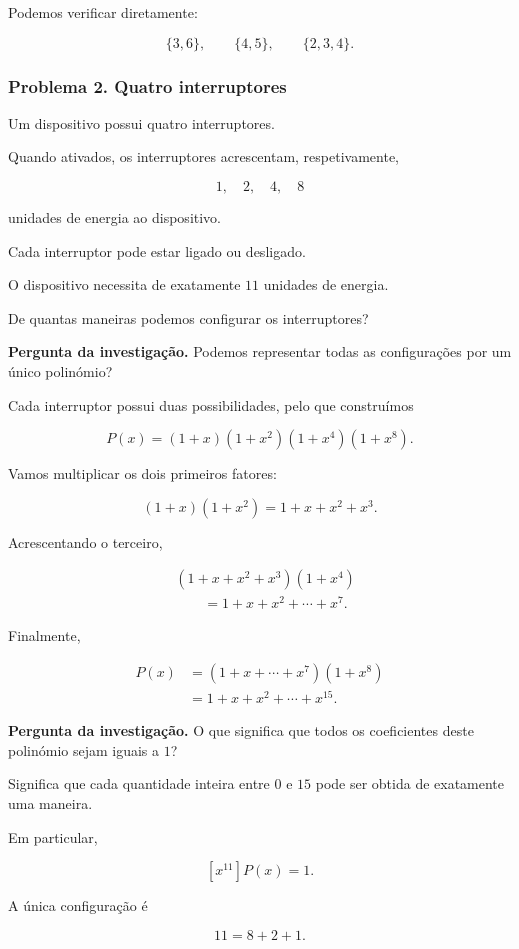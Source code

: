 \documentclass[11pt,a4paper,oneside]{book}
\newcommand{\Pergunta}[1]{\begin{perguntabox}\textbf{Pergunta da investigação.} #1\end{perguntabox}}
\begin{document}
Podemos verificar diretamente:

\[
\{3,6\},\qquad
\{4,5\},\qquad
\{2,3,4\}.
\]

\subsubsection*{Problema 2. Quatro interruptores}

Um dispositivo possui quatro interruptores.

Quando ativados, os interruptores acrescentam,
respetivamente,

\[
1,\quad2,\quad4,\quad8
\]

unidades de energia ao dispositivo.

Cada interruptor pode estar ligado ou desligado.

O dispositivo necessita de exatamente
$11$ unidades de energia.

De quantas maneiras podemos configurar
os interruptores?

\Pergunta{Podemos representar todas as
configurações por um único polinómio?}

Cada interruptor possui duas possibilidades,
pelo que construímos

\[
P(x)=
(1+x)(1+x^2)(1+x^4)(1+x^8).
\]

Vamos multiplicar os dois primeiros fatores:

\[
(1+x)(1+x^2)=1+x+x^2+x^3.
\]

Acrescentando o terceiro,

\[
\begin{aligned}
&(1+x+x^2+x^3)(1+x^4)\\
&\qquad=1+x+x^2+\cdots+x^7.
\end{aligned}
\]

Finalmente,

\[
\begin{aligned}
P(x)
&=(1+x+\cdots+x^7)(1+x^8)\\
&=1+x+x^2+\cdots+x^{15}.
\end{aligned}
\]

\Pergunta{O que significa que todos os
coeficientes deste polinómio sejam iguais a $1$?}

Significa que cada quantidade inteira
entre $0$ e $15$ pode ser obtida
de exatamente uma maneira.

Em particular,

\[
[x^{11}]P(x)=1.
\]

A única configuração é

\[
11=8+2+1.
\]
\end{document}
